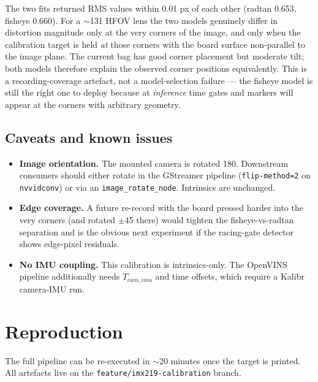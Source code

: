 \documentclass[11pt,a4paper]{article}
\begin{document}
The two fits returned RMS values within 0.01 px of each other (radtan 0.653, fisheye 0.660). For a $\sim$131\textdegree{} HFOV lens the two models genuinely differ in distortion magnitude only at the very corners of the image, and only when the calibration target is held \emph{at} those corners with the board surface non-parallel to the image plane. The current bag has good corner placement but moderate tilt; both models therefore explain the observed corner positions equivalently. This is a recording-coverage artefact, not a model-selection failure --- the fisheye model is still the right one to deploy because at \emph{inference} time gates and markers will appear at the corners with arbitrary geometry.

\subsection{Caveats and known issues}

\begin{itemize}[leftmargin=18pt, itemsep=4pt]
\item \textbf{Image orientation.} The mounted camera is rotated 180\textdegree{}. Downstream consumers should either rotate in the GStreamer pipeline (\texttt{flip-method=2} on \texttt{nvvidconv}) or via an \texttt{image\_rotate\_node}. Intrinsics are unchanged.
\item \textbf{Edge coverage.} A future re-record with the board pressed harder into the very corners (and rotated $\pm$45\textdegree{} there) would tighten the fisheye-vs-radtan separation and is the obvious next experiment if the racing-gate detector shows edge-pixel residuals.
\item \textbf{No IMU coupling.} This calibration is intrinsics-only. The OpenVINS pipeline additionally needs $T_{cam,imu}$ and time offsets, which require a Kalibr camera-IMU run.
\end{itemize}

\clearpage

\section{Reproduction}

The full pipeline can be re-executed in $\sim$20 minutes once the target is printed. All artefacts live on the \texttt{feature/imx219-calibration} branch.
\end{document}
